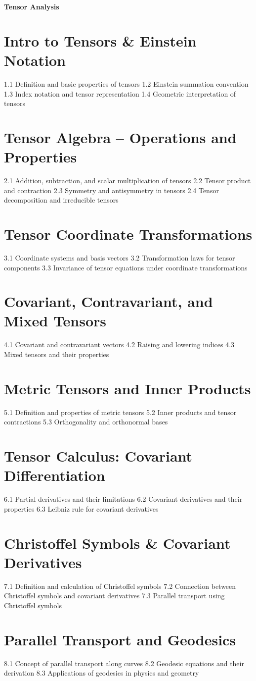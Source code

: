 {\LARGE \bf{Tensor Analysis}}
\section{Intro to Tensors \& Einstein Notation}
1.1 Definition and basic properties of tensors
1.2 Einstein summation convention
1.3 Index notation and tensor representation
1.4 Geometric interpretation of tensors
\section{Tensor Algebra – Operations and Properties}
2.1 Addition, subtraction, and scalar multiplication of tensors
2.2 Tensor product and contraction
2.3 Symmetry and antisymmetry in tensors
2.4 Tensor decomposition and irreducible tensors
\section{Tensor Coordinate Transformations}
3.1 Coordinate systems and basis vectors
3.2 Transformation laws for tensor components
3.3 Invariance of tensor equations under coordinate transformations
\section{Covariant, Contravariant, and Mixed Tensors}
4.1 Covariant and contravariant vectors
4.2 Raising and lowering indices
4.3 Mixed tensors and their properties
\section{Metric Tensors and Inner Products}
5.1 Definition and properties of metric tensors
5.2 Inner products and tensor contractions
5.3 Orthogonality and orthonormal bases
\section{Tensor Calculus: Covariant Differentiation}
6.1 Partial derivatives and their limitations
6.2 Covariant derivatives and their properties
6.3 Leibniz rule for covariant derivatives
\section{Christoffel Symbols \& Covariant Derivatives}
7.1 Definition and calculation of Christoffel symbols
7.2 Connection between Christoffel symbols and covariant derivatives
7.3 Parallel transport using Christoffel symbols
\section{Parallel Transport and Geodesics}
8.1 Concept of parallel transport along curves
8.2 Geodesic equations and their derivation
8.3 Applications of geodesics in physics and geometry
